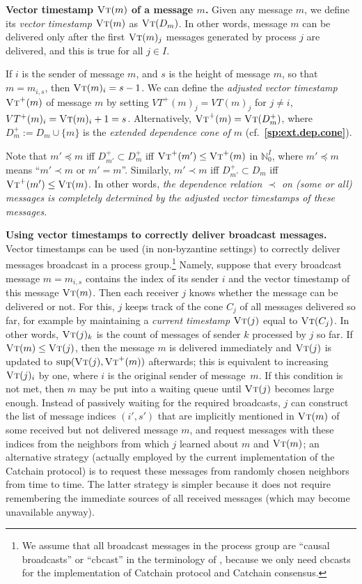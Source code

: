 \documentclass[12pt,oneside]{article}
\def\makepoint#1{\medbreak\noindent{\bf #1.\ }}
\def\nxsubpoint{\refstepcounter{subsubsection}%
  \smallbreak\makepoint{\thesubsubsection}}
\def\refpoint#1{{\rm\textbf{\ref{#1}}}}
\let\ptref=\refpoint
\def\emb#1{\textbf{#1.}}
\def\opsc#1{\operatorname{\textsc{#1}}}
\def\VT{\opsc{Vt}}
\def\bbN{{\mathbb{N}}}
\begin{document}
\nxsubpoint\emb{Vector timestamp $\VT(m)$ of a message $m$}
Given any message $m$, we define its {\em vector timestamp\/} $\VT(m)$ as $\VT(D_m)$. In other words, message $m$ can be delivered only after the first $\VT(m)_j$ messages generated by process $j$ are delivered, and this is true for all $j\in I$.

If $i$ is the sender of message $m$, and $s$ is the height of message $m$, so that $m=m_{i,s}$, then $\VT(m)_i=s-1$. We can define the {\em adjusted vector timestamp\/} $\VT^+(m)$ of message $m$ by setting $VT^+(m)_j=VT(m)_j$ for $j\neq i$, $VT^+(m)_i=\VT(m)_i+1=s$. Alternatively, $\VT^+(m)=\VT(D^+_m)$, where $D^+_m:=D_m\cup\{m\}$ is the {\em extended dependence cone of $m$} (cf.~\ptref{sp:ext.dep.cone}).

Note that $m'\preceq m$ iff $D^+_{m'}\subset D^+_m$ iff $\VT^+(m')\leq\VT^+(m)$ in $\bbN_0^I$, where $m'\preceq m$ means ``$m'\prec m$ or $m'=m$''. Similarly, $m'\prec m$ iff $D^+_{m'}\subset D_m$ iff $\VT^+(m')\leq\VT(m)$. In other words, {\em the dependence relation $\prec$ on (some or all) messages is completely determined by the adjusted vector timestamps of these messages.}

\nxsubpoint\emb{Using vector timestamps to correctly deliver broadcast messages}
Vector timestamps can be used (in non-byzantine settings) to correctly deliver messages broadcast in a process group.\footnote{We assume that all broadcast messages in the process group are ``causal broadcasts'' or ``cbcast'' in the terminology of \cite{Birman}, because we only need cbcasts for the implementation of Catchain protocol and Catchain consensus.} Namely, suppose that every broadcast message $m=m_{i,s}$ contains the index of its sender $i$ and the vector timestamp of this message $\VT(m)$. Then each receiver $j$ knows whether the message can be delivered or not. For this, $j$ keeps track of the cone $C_j$ of all messages delivered so far, for example by maintaining a {\em current timestamp} $\VT(j)$ equal to $\VT(C_j)$. In other words, $\VT(j)_k$ is the count of messages of sender $k$ processed by $j$ so far. If $\VT(m)\leq\VT(j)$, then the message $m$ is delivered immediately and $\VT(j)$ is updated to $\sup(\VT(j),\VT^+(m))$ afterwards; this is equivalent to increasing $\VT(j)_i$ by one, where $i$ is the original sender of message~$m$. If this condition is not met, then $m$ may be put into a waiting queue until $\VT(j)$ becomes large enough. Instead of passively waiting for the required broadcasts, $j$ can construct the list of message indices $(i',s')$ that are implicitly mentioned in $\VT(m)$ of some received but not delivered message $m$, and request messages with these indices from the neighbors from which $j$ learned about $m$ and $\VT(m)$; an alternative strategy (actually employed by the current implementation of the Catchain protocol) is to request these messages from randomly chosen neighbors from time to time. The latter strategy is simpler because it does not require remembering the immediate sources of all received messages (which may become unavailable anyway).
\end{document}
